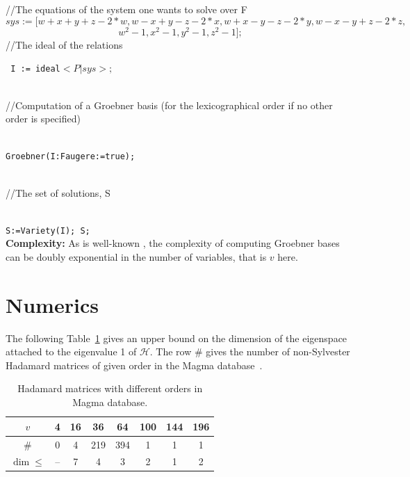 \documentclass[12pt]{article}
\begin{document}
//The equations of the system one wants to solve over F
$$sys:=[w+x+y+z-2*w,w-x+y-z-2*x,w+x-y-z-2*y,w-x-y+z-2*z, $$ $$w^2-1,x^2-1,y^2-1,z^2-1];$$
//The ideal of the relations

{\tt
I := ideal$<P | sys>;$} \\ \ \


//Computation of a Groebner basis (for the lexicographical order if no other order is specified)\\ \ \

{\tt Groebner(I:Faugere:=true);} \\ \ \

//The set of solutions, S \\ \ \

{\tt S:=Variety(I);
S;}\\
{\bf Complexity:} As is well-known \cite{AL}, the complexity of computing Groebner bases can be doubly exponential in the number of variables, that is $v$ here.

\section{Numerics}
\label{sec:num}

The following Table~\ref{tab:upper:bound} gives an upper bound on the dimension of the eigenspace attached to the eigenvalue 1 of $\mathcal{H}$. The row $\#$ gives the number of non-Sylvester Hadamard matrices  of given order in the Magma database~\cite{Ma}.


\begin{table}[!ht]
	\centering
	\caption{Hadamard matrices with different orders in Magma database.}
	\begin{tabular}{|c|c|c|c|c|c|c|c|}
		\hline
		$v$ & 4 & 16 & 36 & 64 & 100 & 144 & 196  \\ \hline
		$\#$ & 0 & 4 & 219 & 394 & 1 & 1   & 1  \\ \hline
		$\dim \le$ & -- & 7 & 4 & 3 & 2 & 1  & 2  \\ \hline
	\end{tabular}
	\label{tab:upper:bound}
\end{table}
\end{document}
